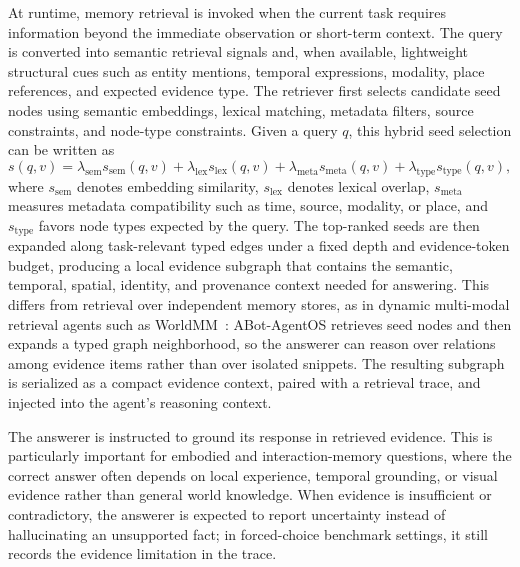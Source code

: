 At runtime, memory retrieval is invoked when the current task requires information beyond the immediate observation or short-term context.
The query is converted into semantic retrieval signals and, when available, lightweight structural cues such as entity mentions, temporal expressions, modality, place references, and expected evidence type.
The retriever first selects candidate seed nodes using semantic embeddings, lexical matching, metadata filters, source constraints, and node-type constraints.
Given a query $q$, this hybrid seed selection can be written as
\begin{equation}
    s(q,v) =
    \lambda_{\mathrm{sem}} s_{\mathrm{sem}}(q,v)
    + \lambda_{\mathrm{lex}} s_{\mathrm{lex}}(q,v)
    + \lambda_{\mathrm{meta}} s_{\mathrm{meta}}(q,v)
    + \lambda_{\mathrm{type}} s_{\mathrm{type}}(q,v),
    \label{eq:hybrid_retrieval_score}
\end{equation}
where $s_{\mathrm{sem}}$ denotes embedding similarity, $s_{\mathrm{lex}}$ denotes lexical overlap, $s_{\mathrm{meta}}$ measures metadata compatibility such as time, source, modality, or place, and $s_{\mathrm{type}}$ favors node types expected by the query.
The top-ranked seeds are then expanded along task-relevant typed edges under a fixed depth and evidence-token budget, producing a local evidence subgraph that contains the semantic, temporal, spatial, identity, and provenance context needed for answering.
This differs from retrieval over independent memory stores, as in dynamic multi-modal retrieval agents such as WorldMM~\cite{worldmm}: ABot-AgentOS retrieves seed nodes and then expands a typed graph neighborhood, so the answerer can reason over relations among evidence items rather than over isolated snippets.
The resulting subgraph is serialized as a compact evidence context, paired with a retrieval trace, and injected into the agent's reasoning context.


The answerer is instructed to ground its response in retrieved evidence.
This is particularly important for embodied and interaction-memory questions, where the correct answer often depends on local experience, temporal grounding, or visual evidence rather than general world knowledge.
When evidence is insufficient or contradictory, the answerer is expected to report uncertainty instead of hallucinating an unsupported fact; in forced-choice benchmark settings, it still records the evidence limitation in the trace.

